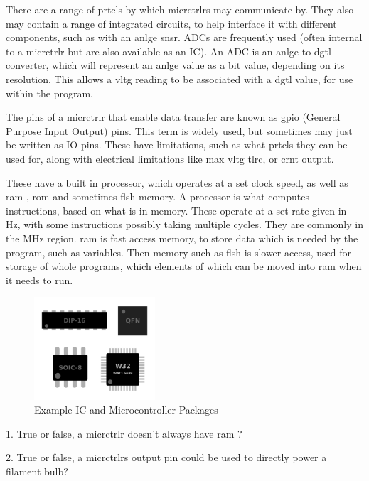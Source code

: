 \documentclass[a4paper,11pt]{report}
\newcommand{\Quiz}[1] %
{
\par\noindent %
\phantomsection %
\todo[inline, color=blue!30]{\textbf{#1}} %
\vspace{1em} %
}
\begin{document}
There are a range of \gls{prtcl}s by which \gls{micrctrlr}s may communicate by. They also may contain a range of integrated circuits, to help interface it with different components, such as with an \gls{anlge} \gls{snsr}. ADCs are frequently used (often internal to a \gls{micrctrlr} but are also available as an IC). An ADC is an \gls{anlge} to \gls{dgtl} converter, which will represent an \gls{anlge} value as a bit value, depending on its resolution. This allows a \gls{vltg} reading to be associated with a \gls{dgtl} value, for use within the program.

The pins of a \gls{micrctrlr} that enable data transfer are known as \gls{gpio} (General Purpose Input Output) pins. This term is widely used, but sometimes may just be written as IO pins. These have limitations, such as what \gls{prtcl}s they can be used for, along with electrical limitations like max \gls{vltg} \gls{tlrc}, or \gls{crnt} output.

These have a built in processor, which operates at a set clock speed, as well as \gls{ram} , \gls{rom}  and sometimes  \gls{flsh}  memory. A processor is what computes instructions, based on what is in memory. These operate at a set rate given in Hz, with some instructions possibly taking multiple cycles. They are commonly in the MHz region. \gls{ram} is fast access memory, to store data which is needed by the program, such as variables. Then memory such as  \gls{flsh}  is slower access, used for storage of whole programs, which elements of which can be moved into \gls{ram} when it needs to run.

\begin{figure}[H]
\centering
\includegraphics[width=0.4\textwidth]{icpackages}
\caption{Example IC and Microcontroller Packages}
\end{figure}

\Quiz{Quiz}

1. True or false, a \gls{micrctrlr} doesn't always have \gls{ram} ?

2. True or false, a \gls{micrctrlr}s output pin could be used to directly power a filament bulb?
\end{document}
